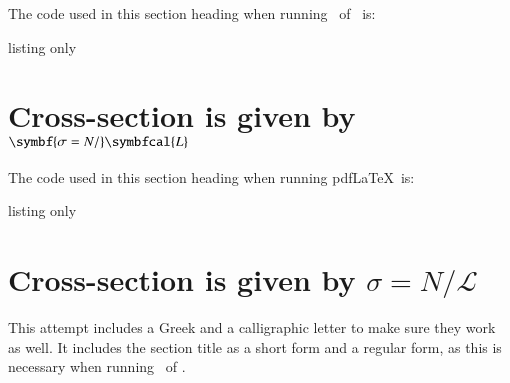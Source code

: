 
The code used in this section heading when running \LuaLaTeX\ of \XeLaTeX\ is:
\begin{tcblisting}{listing only}
\section[Cross-section given by \texorpdfstring{$\sigma = N / \symcal{L}}{sigma = N / L}$]%
  {Cross-section is given by \texorpdfstring{$\symbf{\sigma = N /}\symbfcal{L}$}{sigma = N / L}}%
\end{tcblisting}
The code used in this section heading when running pdf\LaTeX\ is:
\begin{tcblisting}{listing only}
\section[Cross-section given by \texorpdfstring{$\sigma = N / \mathcal{L}$}{sigma = N / L}]%
  {Cross-section is given by \texorpdfstring{$\sigma = N / \mathcal{L}$}{sigma = N / L}}%
\end{tcblisting}

\noindent This attempt includes a Greek and a calligraphic letter to make sure they work as well.
It includes the section title as a short form and a regular form,
as this is necessary when running \LuaLaTeX\ of \XeLaTeX.
